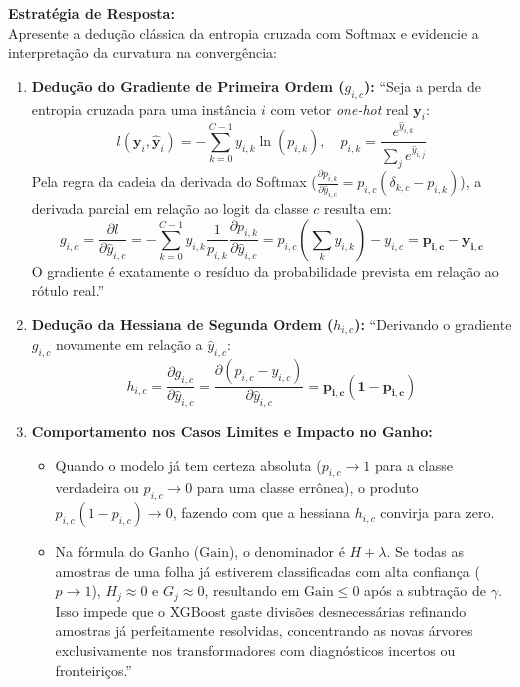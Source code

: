 \documentclass[11pt,a4paper]{article}
\begin{document}
\begin{boardAnswer}
\textbf{Estratégia de Resposta:}\\
Apresente a dedução clássica da entropia cruzada com Softmax e evidencie a interpretação da curvatura na convergência:

\begin{enumerate}[leftmargin=0.8cm]
  \item \textbf{Dedução do Gradiente de Primeira Ordem ($g_{i, c}$):} ``Seja a perda de entropia cruzada para uma instância $i$ com vetor \textit{one-hot} real $\mathbf{y}_i$:
  \begin{equation}
    l(\mathbf{y}_i, \hat{\mathbf{y}}_i) = -\sum_{k=0}^{C-1} y_{i, k} \ln(p_{i, k}), \quad p_{i, k} = \frac{e^{\hat{y}_{i, k}}}{\sum_{j} e^{\hat{y}_{i, j}}}
  \end{equation}
  Pela regra da cadeia da derivada do Softmax ($\frac{\partial p_{i, k}}{\partial \hat{y}_{i, c}} = p_{i, c}(\delta_{k, c} - p_{i, k})$), a derivada parcial em relação ao logit da classe $c$ resulta em:
  \begin{equation}
    g_{i, c} = \frac{\partial l}{\partial \hat{y}_{i, c}} = -\sum_{k=0}^{C-1} y_{i, k} \frac{1}{p_{i, k}} \frac{\partial p_{i, k}}{\partial \hat{y}_{i, c}} = p_{i, c} \left( \sum_{k} y_{i, k} \right) - y_{i, c} = \mathbf{p_{i, c} - y_{i, c}}
  \end{equation}
  O gradiente é exatamente o resíduo da probabilidade prevista em relação ao rótulo real.''
  \item \textbf{Dedução da Hessiana de Segunda Ordem ($h_{i, c}$):} ``Derivando o gradiente $g_{i, c}$ novamente em relação a $\hat{y}_{i, c}$:
  \begin{equation}
    h_{i, c} = \frac{\partial g_{i, c}}{\partial \hat{y}_{i, c}} = \frac{\partial (p_{i, c} - y_{i, c})}{\partial \hat{y}_{i, c}} = \mathbf{p_{i, c} (1 - p_{i, c})}
  \end{equation}
  \item \textbf{Comportamento nos Casos Limites e Impacto no Ganho:}
  \begin{itemize}
    \item Quando o modelo já tem certeza absoluta ($p_{i, c} \to 1$ para a classe verdadeira ou $p_{i, c} \to 0$ para uma classe errônea), o produto $p_{i, c}(1 - p_{i, c}) \to 0$, fazendo com que a hessiana $h_{i, c}$ convirja para zero.
    \item Na fórmula do Ganho ($\text{Gain}$), o denominador é $H + \lambda$. Se todas as amostras de uma folha já estiverem classificadas com alta confiança ($p \to 1$), $H_j \approx 0$ e $G_j \approx 0$, resultando em $\text{Gain} \le 0$ após a subtração de $\gamma$. Isso impede que o XGBoost gaste divisões desnecessárias refinando amostras já perfeitamente resolvidas, concentrando as novas árvores exclusivamente nos transformadores com diagnósticos incertos ou fronteiriços.''
  \end{itemize}
\end{enumerate}
\end{boardAnswer}
\end{document}
